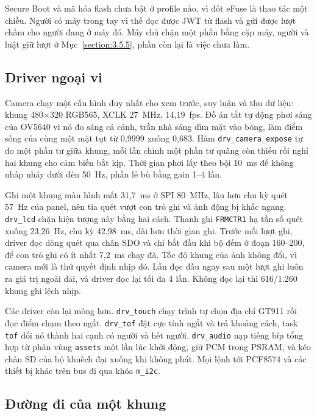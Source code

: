 \documentclass[../DoAn.tex]{subfiles}
\begin{document}
Secure Boot và mã hóa flash chưa bật ở profile nào, vì đốt eFuse là thao tác một chiều. Người có
máy trong tay vì thế đọc được JWT từ flash và gửi được lượt chấm cho người đang ở máy đó. Máy chủ chặn
một phần bằng cặp máy, người và luật giữ lượt ở Mục~\ref{section:3.5.5}, phần còn lại là việc chưa
làm.

\subsection{Driver ngoại vi}
\label{section:4.4.2}

Camera chạy một cấu hình duy nhất cho xem trước, suy luận và thu dữ liệu: khung 480$\times$320
RGB565, XCLK 27~MHz, 14,19~fps. Đồ án tắt tự động phơi sáng của OV5640 vì nó đo sáng cả cảnh, trần
nhà sáng dìm mặt vào bóng, làm điểm sống của cùng một mặt tụt từ 0,9999 xuống 0,683. Hàm
\texttt{drv\_camera\_expose} tự đo một phần tư giữa khung, mỗi lần chỉnh một phần tư quãng còn thiếu
rồi nghỉ hai khung cho cảm biến bắt kịp. Thời gian phơi lấy theo bội 10~ms để không nhấp nháy dưới
đèn 50~Hz, phần lẻ bù bằng gain 1--4 lần.

Ghi một khung màn hình mất 31,7~ms ở SPI 80~MHz, lâu hơn chu kỳ quét 57~Hz của panel, nên tia quét
vượt con trỏ ghi và ảnh động bị khấc ngang. \texttt{drv\_lcd} chặn hiện tượng này bằng hai cách. Thanh ghi
\texttt{FRMCTR1} hạ tần số quét xuống 23,26~Hz, chu kỳ 42,98~ms, dài hơn thời gian ghi. Trước mỗi lượt
ghi, driver đọc dòng quét qua chân SDO và chỉ bắt đầu khi bộ đếm ở đoạn 160--200, để con trỏ ghi có ít nhất 7,2~ms chạy đà. Tốc độ khung của ảnh không đổi, vì camera mới là thứ quyết định nhịp đó. Lần
đọc đầu ngay sau một lượt ghi luôn ra giá trị ngoài dải, và driver đọc lại tối đa 4 lần. Không đọc lại thì 616/1.260 khung ghi lệch nhịp.

Các driver còn lại mỏng hơn. \texttt{drv\_touch} chạy trình tự chọn địa chỉ GT911 rồi đọc điểm chạm theo
ngắt. \texttt{drv\_tof} đặt cực tính ngắt và trả khoảng cách, task \texttt{tof} đổi nó thành hai cạnh có
người và hết người. \texttt{drv\_audio} nạp tiếng bíp tổng hợp từ phân vùng \texttt{assets} một lần lúc
khởi động, giữ PCM trong PSRAM, và kéo chân SD của bộ khuếch đại xuống khi không phát. Mọi lệnh tới
PCF8574 và các thiết bị khác trên bus đi qua khóa \texttt{m\_i2c}.

\subsection{Đường đi của một khung}
\label{section:4.4.3}
\end{document}
